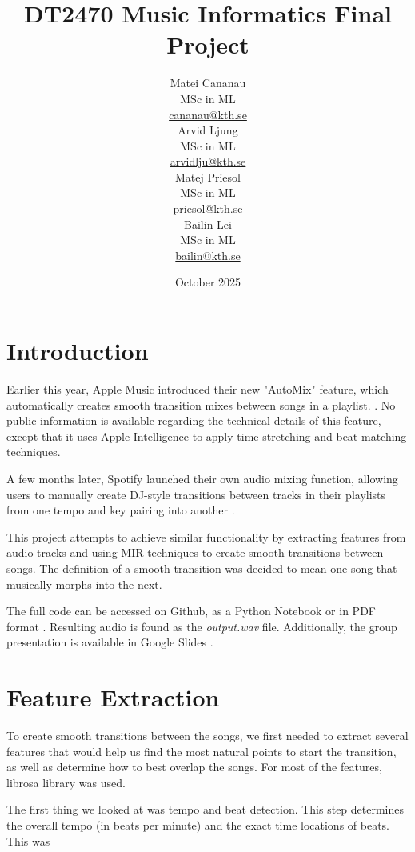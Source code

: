 \documentclass[14pt]{extarticle}
\title{DT2470 Music Informatics Final Project}
\date{October 2025}
\author{
    \begin{minipage}[t]{0.24\textwidth}
        \centering
        Matei Cananau \\
        MSc in ML \\
        \href{mailto:cananau@kth.se}{cananau@kth.se}
    \end{minipage}
    \hfill
    \begin{minipage}[t]{0.24\textwidth}
        \centering
        Arvid Ljung \\
        MSc in ML \\
        \href{mailto:arvidlju@kth.se}{arvidlju@kth.se}
    \end{minipage}
    \hfill
    \begin{minipage}[t]{0.24\textwidth}
        \centering
        Matej Priesol \\
        MSc in ML \\
        \href{mailto:priesol@kth.se}{priesol@kth.se}
    \end{minipage}
    \hfill
    \begin{minipage}[t]{0.24\textwidth}
        \centering
        Bailin Lei \\
        MSc in ML \\
        \href{mailto:bailin@kth.se}{bailin@kth.se}
    \end{minipage}
}
\begin{document}
\maketitle

\tableofcontents

\newpage

\section{Introduction}

Earlier this year, Apple Music introduced their new "AutoMix" feature, which automatically creates smooth transition mixes between songs in a playlist. \cite{apple2025}. No public information is available regarding the technical details of this feature, except that it uses Apple Intelligence to apply time stretching and beat matching techniques.

A few months later, Spotify launched their own audio mixing function, allowing users to manually create DJ-style transitions between tracks in their playlists from one tempo and key pairing into another \cite{spotify2025}.

This project attempts to achieve similar functionality by extracting features from audio tracks and using MIR techniques to create smooth transitions between songs. The definition of a smooth transition was decided to mean one song that musically morphs into the next.

The full code can be accessed on Github, as a Python Notebook or in PDF format \cite{github_repo}. Resulting audio is found as the \textit{output.wav} file. Additionally, the group presentation is available in Google Slides \cite{presentation}.

\section{Feature Extraction}

To create smooth transitions between the songs, we first needed to extract several features that would help us find the most natural points to start the transition, as well as determine how to best overlap the songs. For most of the features, librosa library was used.

The first thing we looked at was tempo and beat detection. This step determines the overall tempo (in beats per minute) and the exact time locations of beats. This was
\end{document}
